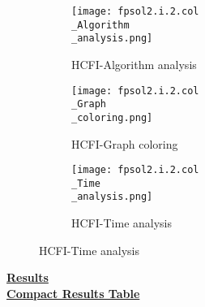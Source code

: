 \documentclass[10pt]{article}
\begin{document}
\graphicspath{{./Core1/Solutions/HCFI/fpsol2.i.2.col}}
\begin{figure}[H]
\begin{subfigure}{.33\textwidth}
  \centering
  \texttt{[image: fpsol2.i.2.col\\\_Algorithm\\\_analysis.png]}
  \caption{HCFI-Algorithm analysis}
   \label{fig:subfig1}
\end{subfigure}%
\begin{subfigure}{.33\textwidth}
  \centering
  \texttt{[image: fpsol2.i.2.col\\\_Graph\\\_coloring.png]}
  \caption{HCFI-Graph coloring}
  \label{fig:subfig2}
\end{subfigure}
\begin{subfigure}{.33\textwidth}
  \centering
  \texttt{[image: fpsol2.i.2.col\\\_Time\\\_analysis.png]}
  \caption{HCFI-Time analysis}
  \end{subfigure}
\end{figure}
\vspace{2cm}
\begin{center}
\hyperlink{page.8}{\textbf{Results}}\\
\vspace{0.5cm}
\hyperlink{page.71}{\textbf{Compact Results Table}}
\end{center}
\pagebreak
\end{document}
